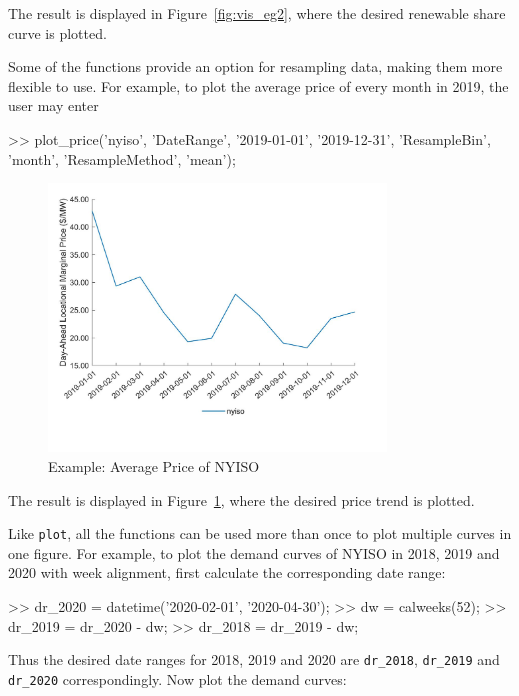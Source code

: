 \documentclass[11pt]{article}
\numberwithin{equation}{section}
\numberwithin{table}{section}
\numberwithin{figure}{section}
\begin{document}
The result is displayed in Figure~\ref{fig:vis_eg2}, where the desired renewable share curve is plotted.

Some of the functions provide an option for resampling data, making them more flexible to use. For example, to plot the average price of every month in 2019, the user may enter

\begin{Code}
  >> plot_price('nyiso', 'DateRange', {'2019-01-01', '2019-12-31'},
  'ResampleBin', 'month', 'ResampleMethod', 'mean');
\end{Code}

\begin{figure}
  \centering
  \noindent\includegraphics[width=0.8\textwidth]{figures/visualization_example3.jpg}
  \caption{Example: Average Price of NYISO} \label{fig:vis_eg3}
\end{figure}

The result is displayed in Figure~\ref{fig:vis_eg3}, where the desired price trend is plotted.

Like \verb!plot!, all the functions can be used more than once to plot multiple curves in one figure. For example, to plot the demand curves of NYISO in 2018, 2019 and 2020 with week alignment, first calculate the corresponding date range:

\begin{Code}
  >> dr_2020 = datetime({'2020-02-01', '2020-04-30'});
  >> dw = calweeks(52);
  >> dr_2019 = dr_2020 - dw;
  >> dr_2018 = dr_2019 - dw;
\end{Code}

Thus the desired date ranges for 2018, 2019 and 2020 are \verb!dr_2018!, \verb!dr_2019! and \verb!dr_2020! correspondingly. Now plot the demand curves:
\end{document}
